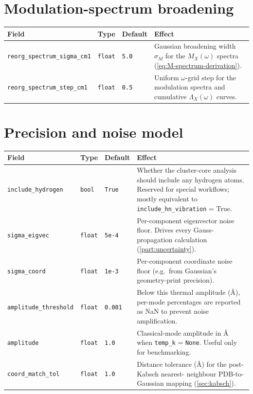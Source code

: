 \documentclass[10pt,a4paper,twoside]{article}
\newcommand{\cfgkey}[1]{\texttt{#1}}
\begin{document}
\section{Modulation-spectrum broadening}

\begin{longtable}{p{} p{} p{} p{}}
\toprule
\textbf{Field} & \textbf{Type} & \textbf{Default} & \textbf{Effect} \\
\midrule
\cfgkey{reorg\_spectrum\_sigma\_cm1} & \texttt{float} & \texttt{5.0}
  & Gaussian broadening width $\sigma_M$ for the $M_X(\omega)$
    spectra (\cref{eq:M-spectrum-derivation}). \\
\cfgkey{reorg\_spectrum\_step\_cm1} & \texttt{float} & \texttt{0.5}
  & Uniform $\omega$-grid step for the modulation spectra and
    cumulative $\Lambda_X(\omega)$ curves. \\
\bottomrule
\end{longtable}

\section{Precision and noise model}

\begin{longtable}{p{} p{} p{} p{}}
\toprule
\textbf{Field} & \textbf{Type} & \textbf{Default} & \textbf{Effect} \\
\midrule
\cfgkey{include\_hydrogen} & \texttt{bool} & \texttt{True}
  & Whether the cluster-core analysis should include any hydrogen
    atoms. Reserved for special workflows; mostly equivalent to
    \cfgkey{include\_hn\_vibration} = True. \\
\cfgkey{sigma\_eigvec} & \texttt{float} & \texttt{5e-4}
  & Per-component eigenvector noise floor. Drives every Gauss-
    propagation calculation (\cref{part:uncertainty}). \\
\cfgkey{sigma\_coord} & \texttt{float} & \texttt{1e-3}
  & Per-component coordinate noise floor (e.g.\ from Gaussian's
    geometry-print precision). \\
\cfgkey{amplitude\_threshold} & \texttt{float} & \texttt{0.001}
  & Below this thermal amplitude (\AA{}), per-mode percentages
    are reported as NaN to prevent noise amplification. \\
\cfgkey{amplitude} & \texttt{float} & \texttt{1.0}
  & Classical-mode amplitude in \AA{} when \cfgkey{temp\_k} =
    \texttt{None}. Useful only for benchmarking. \\
\cfgkey{coord\_match\_tol} & \texttt{float} & \texttt{1.0}
  & Distance tolerance (\AA{}) for the post-Kabsch nearest-
    neighbour PDB-to-Gaussian mapping (\cref{sec:kabsch}). \\
\bottomrule
\end{longtable}
\end{document}
